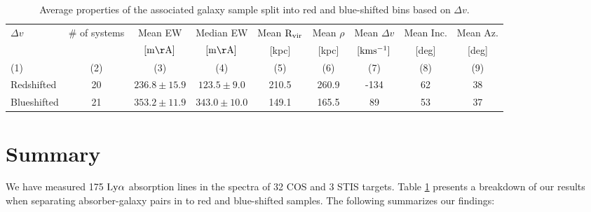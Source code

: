 \documentclass[iop]{emulateapj-rtx4}
\begin{document}



\begin{table}[ht]\footnotesize
\begin{center}
\begin{tabular}{l c c c c c c c c}
 \hline \hline
 $\Delta v$          &  \# of systems  &      Mean EW   & Median EW     & Mean $\rm R_{vir}$ &   Mean $\rho$   &         Mean $\Delta v$           &    Mean Inc.       &  Mean Az.      \\ 
  	               &                        & $\rm [m\AA]$   &  $\rm [m\AA]$ & \scriptsize [kpc]        & \scriptsize [kpc] & \scriptsize $\rm [km s^{-1}]$ & \scriptsize [deg] & \scriptsize [deg] \\
 \scriptsize (1) & \scriptsize (2) & \scriptsize (3)   & \scriptsize (4)  & \scriptsize (5)           & \scriptsize (6)    & \scriptsize  (7)                       & \scriptsize (8)    & \scriptsize (9)      \\ \hline \hline

 Redshifted      & 20                  & $236.8 \pm 15.9$ & $123.5 \pm 9.0$  &  210.5               &   260.9              &       -134                                 &    62                  &  38	\\
 \hline
 Blueshifted    & 21                  & $353.2 \pm 11.9$  & $343.0 \pm 10.0$ & 149.1                &  165.5              &        89                                   &      53                &  37         \\
 
\hline
\end{tabular}
\end{center}
  \caption{\small{Average properties of the associated galaxy sample split into red and blue-shifted bins based on $\Delta v$.}}
  \label{resultsTable}
\end{table}



\section{Summary}

We have measured 175 $\rm Ly\alpha$ absorption lines in the spectra of 32 COS and 3 STIS targets. Table \ref{resultsTable} presents a breakdown of our results when separating absorber-galaxy pairs in to red and blue-shifted samples. The following summarizes our findings:
\end{document}
